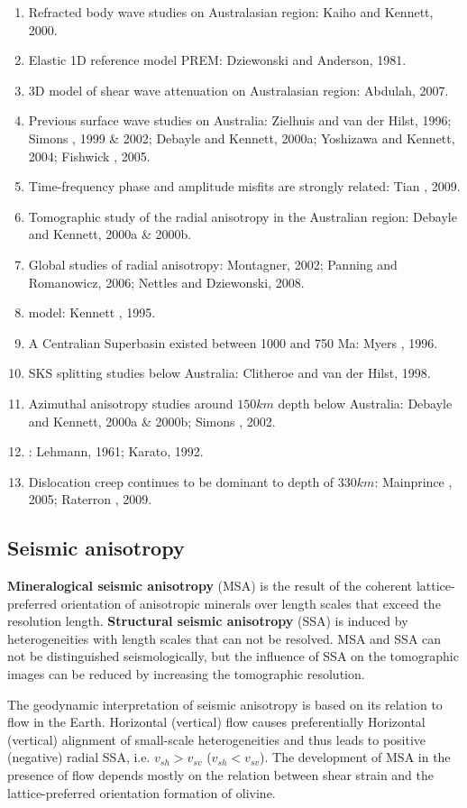 \begin{enumerate}[\hspace{10mm}*]
  \item Refracted body wave studies on Australasian region: Kaiho and Kennett, 2000.
  \item Elastic 1D reference model PREM: Dziewonski and Anderson, 1981.
  \item 3D model of shear wave attenuation on Australasian region: Abdulah, 2007.
  \item Previous surface wave studies on Australia: Zielhuis and van der Hilst, 1996; Simons \etal, 1999 \& 2002; Debayle and Kennett, 2000a; Yoshizawa and Kennett, 2004; Fishwick \etal, 2005. 
  \item Time-frequency phase and amplitude misfits are strongly related: Tian \etal, 2009.
  \item Tomographic study of the radial anisotropy in the Australian region: Debayle and Kennett, 2000a \& 2000b.
  \item Global studies of radial anisotropy: Montagner, 2002; Panning and Romanowicz, 2006; Nettles and Dziewonski, 2008.
  \item {} model: Kennett \etal, 1995.
  \item A Centralian Superbasin existed between 1000 and 750 Ma: Myers \etal, 1996.
  \item SKS splitting studies below Australia: Clitheroe and van der Hilst, 1998.
  \item Azimuthal anisotropy studies around $150km$ depth below Australia: Debayle and Kennett, 2000a \& 2000b; Simons \etal, 2002.
  \item {}: Lehmann, 1961; Karato, 1992.
  \item Dislocation creep continues to be dominant to depth of $330km$: Mainprince \etal, 2005; Raterron \etal, 2009.
\end{enumerate}\par
\subsection{Seismic anisotropy}
\textbf{Mineralogical seismic anisotropy} (MSA) is the result of the coherent lattice-preferred orientation of anisotropic minerals over length scales that exceed the resolution length. \textbf{Structural seismic anisotropy} (SSA) is induced by heterogeneities with length scales that can not be resolved. MSA and SSA can not be distinguished seismologically, but the influence of SSA on the tomographic images can be reduced by increasing the tomographic resolution.\par
The geodynamic interpretation of seismic anisotropy is based on its relation to flow in the Earth. Horizontal (vertical) flow causes preferentially Horizontal (vertical) alignment of small-scale heterogeneities and thus leads to positive (negative) radial SSA, i.e. $v_{sh}>v_{sv}$ ($v_{sh}<v_{sv}$). The development of MSA in the presence of flow depends mostly on the relation between shear strain and the lattice-preferred orientation formation of olivine.\par
